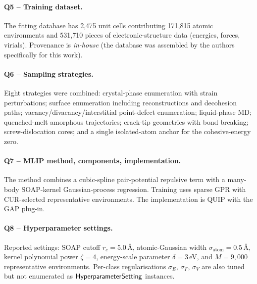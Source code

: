 \paragraph{Q5 -- Training dataset.}
The fitting database has 2{,}475 unit cells contributing 171{,}815
atomic environments and 531{,}710 pieces of electronic-structure data
(energies, forces, virials). Provenance is \emph{in-house} (the
database was assembled by the authors specifically for this work).


\paragraph{Q6 -- Sampling strategies.}
Eight strategies were combined: crystal-phase enumeration with strain
perturbations; surface enumeration including reconstructions and
decohesion paths; vacancy/divacancy/interstitial point-defect
enumeration; liquid-phase MD; quenched-melt amorphous trajectories;
crack-tip geometries with bond breaking; screw-dislocation cores;
and a single isolated-atom anchor for the cohesive-energy zero.


\paragraph{Q7 -- MLIP method, components, implementation.}
The method combines a cubic-spline pair-potential repulsive term with
a many-body SOAP-kernel Gaussian-process regression. Training uses
sparse GPR with CUR-selected representative environments. The
implementation is QUIP with the GAP plug-in.


\paragraph{Q8 -- Hyperparameter settings.}
Reported settings: SOAP cutoff $r_c=5.0$\,\AA, atomic-Gaussian width
$\sigma_{\text{atom}}=0.5$\,\AA, kernel polynomial power $\zeta=4$,
energy-scale parameter $\delta=3$\,eV, and $M=9{,}000$ representative
environments. Per-class regularisations $\sigma_E$, $\sigma_F$,
$\sigma_V$ are also tuned but not enumerated as
$\mathsf{HyperparameterSetting}$ instances.


